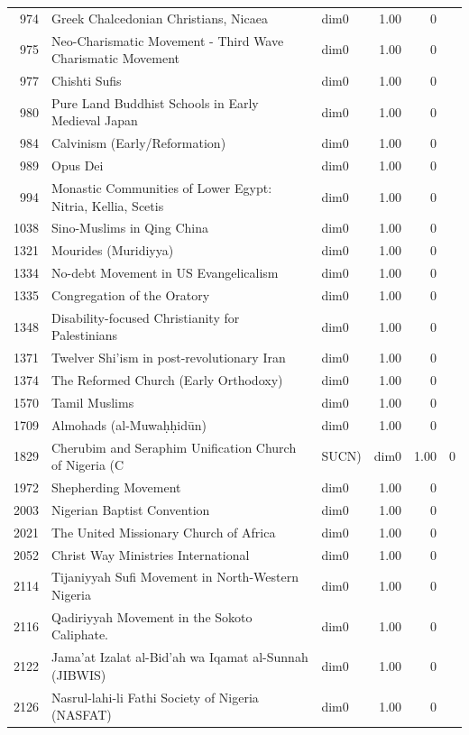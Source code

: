 \begin{tabular}{rllrr}
974 & Greek Chalcedonian Christians, Nicaea & dim0 & 1.00 & 0 \\
975 & Neo-Charismatic Movement - Third Wave Charismatic Movement & dim0 & 1.00 & 0 \\
977 & Chishti Sufis & dim0 & 1.00 & 0 \\
980 & Pure Land Buddhist Schools in Early Medieval Japan & dim0 & 1.00 & 0 \\
984 & Calvinism (Early/Reformation) & dim0 & 1.00 & 0 \\
989 & Opus Dei & dim0 & 1.00 & 0 \\
994 & Monastic Communities of Lower Egypt: Nitria, Kellia, Scetis & dim0 & 1.00 & 0 \\
1038 & Sino-Muslims in Qing China & dim0 & 1.00 & 0 \\
1321 & Mourides (Muridiyya) & dim0 & 1.00 & 0 \\
1334 & No-debt Movement in US Evangelicalism & dim0 & 1.00 & 0 \\
1335 & Congregation of the Oratory & dim0 & 1.00 & 0 \\
1348 & Disability-focused Christianity for Palestinians & dim0 & 1.00 & 0 \\
1371 & Twelver Shi'ism in post-revolutionary Iran & dim0 & 1.00 & 0 \\
1374 & The Reformed Church (Early Orthodoxy) & dim0 & 1.00 & 0 \\
1570 & Tamil Muslims & dim0 & 1.00 & 0 \\
1709 & Almohads (al-Muwaḥḥidūn) & dim0 & 1.00 & 0 \\
1829 & Cherubim and Seraphim Unification Church of Nigeria (C&SUCN) & dim0 & 1.00 & 0 \\
1972 & Shepherding Movement & dim0 & 1.00 & 0 \\
2003 & Nigerian Baptist Convention & dim0 & 1.00 & 0 \\
2021 & The United Missionary Church of Africa & dim0 & 1.00 & 0 \\
2052 & Christ Way Ministries International & dim0 & 1.00 & 0 \\
2114 & Tijaniyyah Sufi Movement in North-Western Nigeria & dim0 & 1.00 & 0 \\
2116 & Qadiriyyah Movement in the Sokoto Caliphate. & dim0 & 1.00 & 0 \\
2122 & Jama'at Izalat al-Bid'ah wa Iqamat al-Sunnah (JIBWIS) & dim0 & 1.00 & 0 \\
2126 & Nasrul-lahi-li Fathi Society of Nigeria (NASFAT) & dim0 & 1.00 & 0 \\

\end{tabular}
